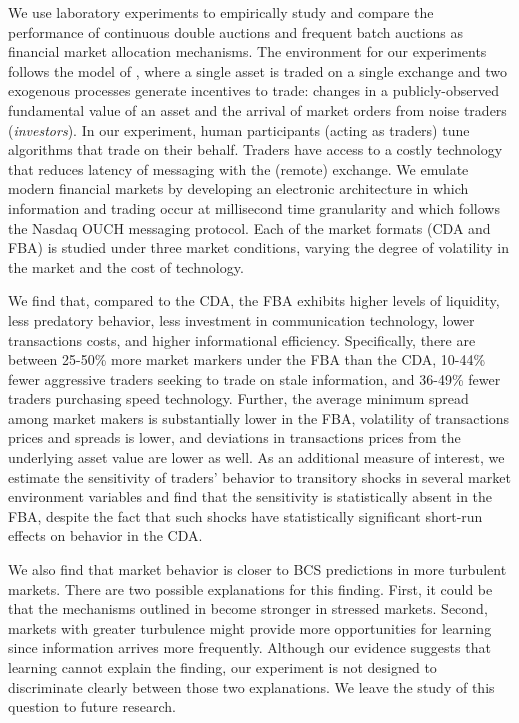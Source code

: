 \documentclass[12pt]{article}
\begin{document}
We use laboratory experiments to empirically study and compare the performance of continuous double auctions and frequent batch auctions as financial market allocation mechanisms. The environment for our experiments follows the model of \cite{Budish2015}, where a single asset is traded on a single exchange and two exogenous processes generate incentives to trade: changes in a publicly-observed fundamental value of an asset and the arrival of market orders from noise traders (\textit{investors}).  In our experiment, human participants (acting as traders) tune algorithms that trade on their behalf. Traders have access to a costly technology that reduces latency of messaging with the (remote) exchange. We emulate modern financial markets by developing an electronic architecture in which information and trading occur at millisecond time granularity and which follows the Nasdaq OUCH messaging protocol. Each of the market formats (CDA and FBA) is studied under three market conditions, varying the degree of volatility in the market and the cost of technology.

We find that, compared to the CDA, the FBA exhibits higher levels of liquidity, less predatory behavior, less investment in communication technology, lower transactions costs, and higher informational efficiency. Specifically, there are between 25-50\% more market markers under the FBA than the CDA, 10-44\% fewer aggressive traders seeking to trade on stale information, and 36-49\% fewer traders purchasing speed technology. 
Further, the average minimum spread among market makers is substantially lower in the FBA, volatility of transactions prices and spreads is lower, and deviations in transactions prices from the underlying asset value are lower as well. As an additional measure of interest, we estimate the sensitivity of traders' behavior to transitory shocks in several market environment variables and find that the sensitivity is statistically absent in the FBA, despite the fact that such shocks have statistically significant short-run effects on behavior in the CDA.

We also find that market behavior is closer to BCS predictions in more turbulent markets. There are two possible explanations for this finding. First, it could be that the mechanisms outlined in \cite{Budish2015} become stronger in stressed markets. Second, markets with greater turbulence might provide more opportunities for learning since information arrives more frequently. Although our evidence suggests that learning cannot explain the finding, our experiment is not designed to discriminate clearly between those two explanations. We leave the study of this question to future research.
\end{document}

